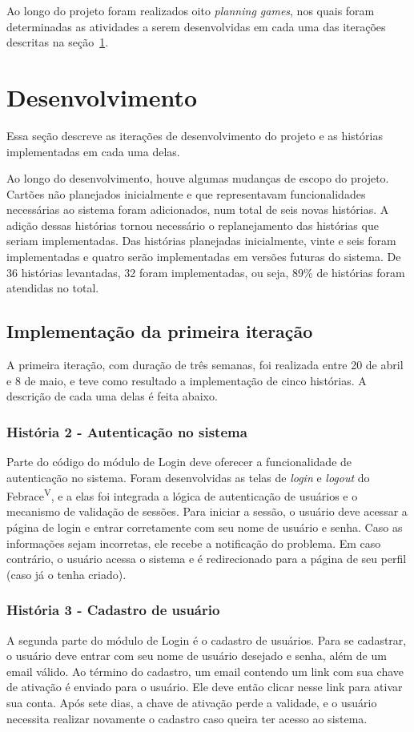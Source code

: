     Ao longo do projeto foram realizados oito \textit{planning games}, nos quais foram determinadas as atividades a serem desenvolvidas em cada uma das iterações descritas na seção~\ref{iteracoes}.

\section{Desenvolvimento}\label{iteracoes}

  Essa seção descreve as iterações de desenvolvimento do projeto e as histórias implementadas em cada uma delas.

  Ao longo do desenvolvimento, houve algumas mudanças de escopo do projeto. Cartões não planejados inicialmente e que representavam funcionalidades necessárias ao sistema foram adicionados, num total de seis novas histórias. A adição dessas histórias tornou necessário o replanejamento das histórias que seriam implementadas. Das histórias planejadas inicialmente, vinte e seis foram implementadas e quatro serão implementadas em versões futuras do sistema. De 36 histórias levantadas, 32 foram implementadas, ou seja, 89\% de histórias foram atendidas no total.

  \subsection{Implementação da primeira iteração}
    A primeira iteração, com duração de três semanas, foi realizada entre 20 de abril e 8 de maio, e teve como resultado a implementação de cinco histórias. A descrição de cada uma delas é feita abaixo.

    \subsubsection{História 2 - Autenticação no sistema}
      Parte do código do módulo de Login deve oferecer a funcionalidade de autenticação no sistema. Foram desenvolvidas as telas de \textit{login} e \textit{logout} do Febrace\textsuperscript{V}, e a elas foi integrada a lógica de autenticação de usuários e o mecanismo de validação de sessões. Para iniciar a sessão, o usuário deve acessar a página de login e entrar corretamente com seu nome de usuário e senha. Caso as informações sejam incorretas, ele recebe a notificação do problema. Em caso contrário, o usuário acessa o sistema e é redirecionado para a página de seu perfil (caso já o tenha criado).

    \subsubsection{História 3 - Cadastro de usuário}
      A segunda parte do módulo de Login é o cadastro de usuários. Para se cadastrar, o usuário deve entrar com seu nome de usuário desejado e senha, além de um email válido. Ao término do cadastro, um email contendo um link com sua chave de ativação é enviado para o usuário. Ele deve então clicar nesse link para ativar sua conta. Após sete dias, a chave de ativação perde a validade, e o usuário necessita realizar novamente o cadastro caso queira ter acesso ao sistema.


